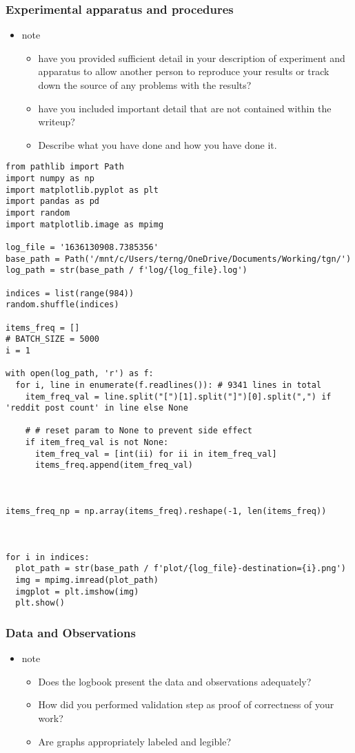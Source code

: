 \documentclass[11pt]{article}
\begin{document}
\subsubsection{Experimental apparatus and procedures}
\label{sec:org1d30ce2}
\begin{itemize}
\item note
\begin{itemize}
\item have you provided sufficient detail in your description of experiment and apparatus to allow another person to reproduce your results or track down the source of any problems with the results?
\item have you included important detail that are not contained within the writeup?
\item Describe what you have done and how you have done it.
\end{itemize}
\end{itemize}

\begin{verbatim}
from pathlib import Path
import numpy as np
import matplotlib.pyplot as plt
import pandas as pd
import random
import matplotlib.image as mpimg

log_file = '1636130908.7385356'
base_path = Path('/mnt/c/Users/terng/OneDrive/Documents/Working/tgn/')
log_path = str(base_path / f'log/{log_file}.log')

indices = list(range(984))
random.shuffle(indices)

items_freq = []
# BATCH_SIZE = 5000
i = 1

with open(log_path, 'r') as f:
  for i, line in enumerate(f.readlines()): # 9341 lines in total
    item_freq_val = line.split("[")[1].split("]")[0].split(",") if 'reddit post count' in line else None

    # # reset param to None to prevent side effect
    if item_freq_val is not None:
      item_freq_val = [int(ii) for ii in item_freq_val]
      items_freq.append(item_freq_val)



items_freq_np = np.array(items_freq).reshape(-1, len(items_freq))



for i in indices:
  plot_path = str(base_path / f'plot/{log_file}-destination={i}.png')
  img = mpimg.imread(plot_path)
  imgplot = plt.imshow(img)
  plt.show()
\end{verbatim}

\subsubsection{Data and Observations}
\label{sec:org460aa93}
\begin{itemize}
\item note
\begin{itemize}
\item Does the logbook present the data and observations adequately?
\item How did you performed validation step as proof of correctness of your work?
\item Are graphs appropriately labeled and legible?
\end{itemize}
\end{itemize}
\end{document}
